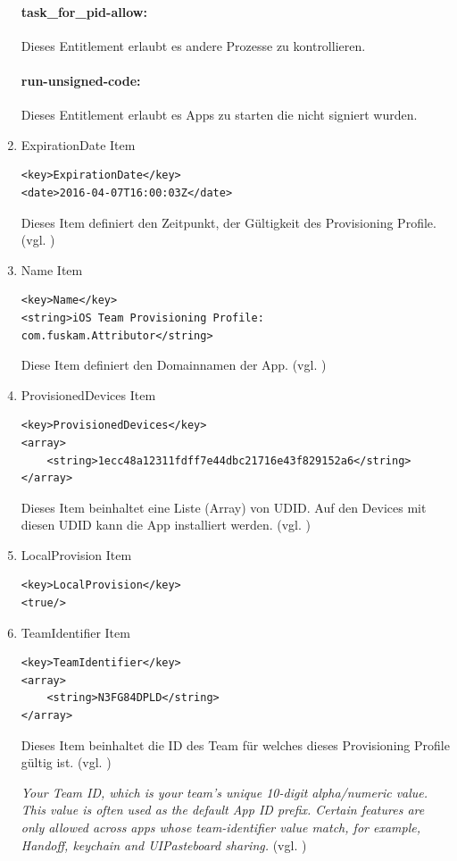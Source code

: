\begin{enumerate}
\paragraph{task\_for\_pid-allow:} Dieses Entitlement erlaubt es andere Prozesse zu kontrollieren. 

\paragraph{run-unsigned-code:} Dieses Entitlement erlaubt es Apps zu starten die nicht signiert wurden.

    \item ExpirationDate Item
\begin{lstlisting}[captionpos=b, caption={ExpirationDate Item}]
<key>ExpirationDate</key>
<date>2016-04-07T16:00:03Z</date>
\end{lstlisting}
Dieses Item definiert den Zeitpunkt, der Gültigkeit des Provisioning Profile.(vgl. \cite{iOSSec[5], Hacking[1]})

    \item Name Item
\begin{lstlisting}[captionpos=b, caption={Name Item}]
<key>Name</key>
<string>iOS Team Provisioning Profile: com.fuskam.Attributor</string>
\end{lstlisting}
Diese Item definiert den Domainnamen der App. (vgl. \cite{iOSSec[5], Hacking[1]})

    \item ProvisionedDevices Item
\begin{lstlisting}[captionpos=b, caption={ProvisionedDevices Item}]
<key>ProvisionedDevices</key>
<array>
    <string>1ecc48a12311fdff7e44dbc21716e43f829152a6</string>
</array>
\end{lstlisting}
Dieses Item beinhaltet eine Liste (Array) von UDID. Auf den Devices mit diesen UDID kann die App installiert werden. (vgl. \cite{iOSSec[5], Hacking[1]})

  \item LocalProvision Item
\begin{lstlisting}[captionpos=b, caption={LocalProvision Item}]
<key>LocalProvision</key>
<true/>
\end{lstlisting}

    \item TeamIdentifier Item
\begin{lstlisting}[captionpos=b, caption={TeamIdentifier Item}]
<key>TeamIdentifier</key>
<array>
    <string>N3FG84DPLD</string>
</array>
\end{lstlisting}
Dieses Item beinhaltet die ID des Team für welches dieses Provisioning Profile gültig ist. (vgl. \cite{iOSSec[5], Hacking[1]}) \par
\glqq \textit{Your Team ID, which is your team's unique 10-digit alpha/numeric value. This value is often used as the default App ID prefix. Certain features are only allowed across apps whose team-identifier value match, for example, Handoff, keychain and UIPasteboard sharing.}\grqq{} (vgl. \cite{ProvisioningProfile[3]})


\end{enumerate}
